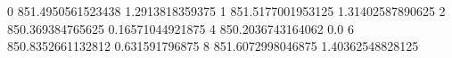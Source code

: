 0 851.4950561523438 1.2913818359375
1 851.5177001953125 1.31402587890625
2 850.369384765625 0.16571044921875
4 850.2036743164062 0.0
6 850.8352661132812 0.631591796875
8 851.6072998046875 1.40362548828125
